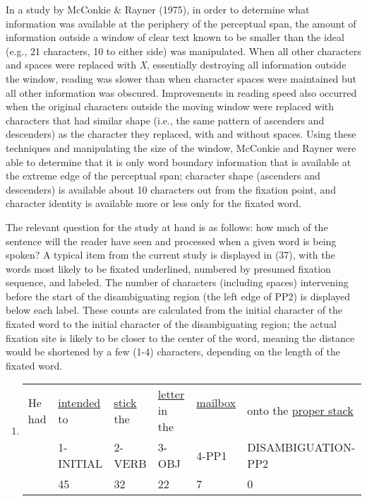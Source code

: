 \documentclass[11pt,oneside]{book}
\begin{document}
In a study by McConkie \& Rayner (1975), in order to determine what information was available at the periphery of the perceptual span, the amount of information outside a window of clear text known to be smaller than the ideal (e.g., 21 characters, 10 to either side) was manipulated. When all other characters and spaces were replaced with \emph{X}, essentially destroying all information outside the window, reading was slower than when character spaces were maintained but all other information was obscured. Improvements in reading speed also occurred when the original characters outside the moving window were replaced with characters that had similar shape (i.e., the same pattern of ascenders and descenders) as the character they replaced, with and without spaces. Using these techniques and manipulating the size of the window, McConkie and Rayner were able to determine that it is only word boundary information that is available at the extreme edge of the perceptual span; character shape (ascenders and descenders) is available about 10 characters out from the fixation point, and character identity is available more or less only for the fixated word.

The relevant question for the study at hand is as follows: how much of the sentence will the reader have seen and processed when a given word is being spoken? A typical item from the current study is displayed in (37), with the words most likely to be fixated underlined, numbered by presumed fixation sequence, and labeled. The number of characters (including spaces) intervening before the start of the disambiguating region (the left edge of PP2) is displayed below each label. These counts are calculated from the initial character of the fixated word to the initial character of the disambiguating region; the actual fixation site is likely to be closer to the center of the word, meaning the distance would be shortened by a few (1-4) characters, depending on the length of the fixated word.

\begin{enumerate}
\def\labelenumi{(\arabic{enumi})}
\setcounter{enumi}{36}
\item
  \begingroup
    \setlength{\tabcolsep}{1pt}
    \begin{tabular}{lllll|l}
  He had & 
  \underline{intended} to & 
  \underline{stick} the & 
  \underline{letter} in the & 
  \underline{mailbox} \  & onto the \underline{proper stack} \\
  & \footnotesize 1-INITIAL & \footnotesize 2-VERB & \footnotesize 3-OBJ & \footnotesize 4-PP1 & \footnotesize DISAMBIGUATION-PP2 \\
  & 45 & 32 & 22 & 7 & 0
  \end{tabular}
  \endgroup
\end{enumerate}
\end{document}
